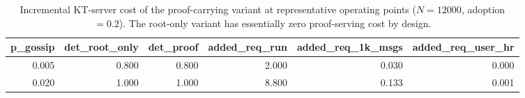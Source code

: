 \begin{table}
\caption{Incremental KT-server cost of the proof-carrying variant at representative operating points ($N=12000$, adoption $=0.2$). The root-only variant has essentially zero proof-serving cost by design.}
\label{tab:server-cost-operating-points}
\begin{tabular}{rrrrrr}
\toprule
p_gossip & det_root_only & det_proof & added_req_run & added_req_1k_msgs & added_req_user_hr \\
\midrule
0.005 & 0.800 & 0.800 & 2.000 & 0.030 & 0.000 \\
0.020 & 1.000 & 1.000 & 8.800 & 0.133 & 0.001 \\
\bottomrule
\end{tabular}
\end{table}
